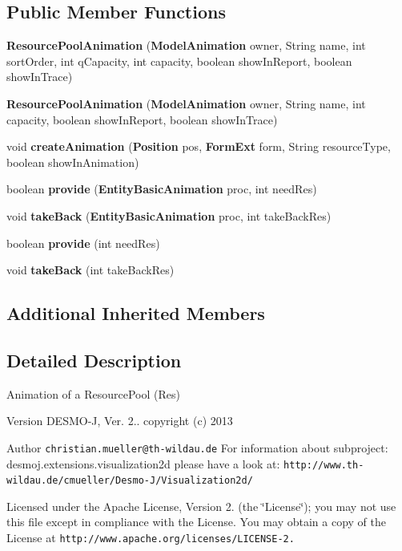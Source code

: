 \subsection*{Public Member Functions}
\begin{DoxyCompactItemize}
\item 
{\bf Resource\-Pool\-Animation} ({\bf Model\-Animation} owner, String name, int sort\-Order, int q\-Capacity, int capacity, boolean show\-In\-Report, boolean show\-In\-Trace)
\item 
{\bf Resource\-Pool\-Animation} ({\bf Model\-Animation} owner, String name, int capacity, boolean show\-In\-Report, boolean show\-In\-Trace)
\item 
void {\bf create\-Animation} ({\bf Position} pos, {\bf Form\-Ext} form, String resource\-Type, boolean show\-In\-Animation)
\item 
boolean {\bf provide} ({\bf Entity\-Basic\-Animation} proc, int need\-Res)
\item 
void {\bf take\-Back} ({\bf Entity\-Basic\-Animation} proc, int take\-Back\-Res)
\item 
boolean {\bf provide} (int need\-Res)
\item 
void {\bf take\-Back} (int take\-Back\-Res)
\end{DoxyCompactItemize}
\subsection*{Additional Inherited Members}


\subsection{Detailed Description}
Animation of a Resource\-Pool (Res)

\begin{DoxyVersion}{Version}
D\-E\-S\-M\-O-\/\-J, Ver. 2.. copyright (c) 2013 
\end{DoxyVersion}
\begin{DoxyAuthor}{Author}
{\tt christian.\-mueller@th-\/wildau.\-de} For information about subproject\-: desmoj.\-extensions.\-visualization2d please have a look at\-: {\tt http\-://www.\-th-\/wildau.\-de/cmueller/\-Desmo-\/\-J/\-Visualization2d/}
\end{DoxyAuthor}
Licensed under the Apache License, Version 2. (the \char`\"{}\-License\char`\"{}); you may not use this file except in compliance with the License. You may obtain a copy of the License at {\tt http\-://www.\-apache.\-org/licenses/\-L\-I\-C\-E\-N\-S\-E-\/2.}

